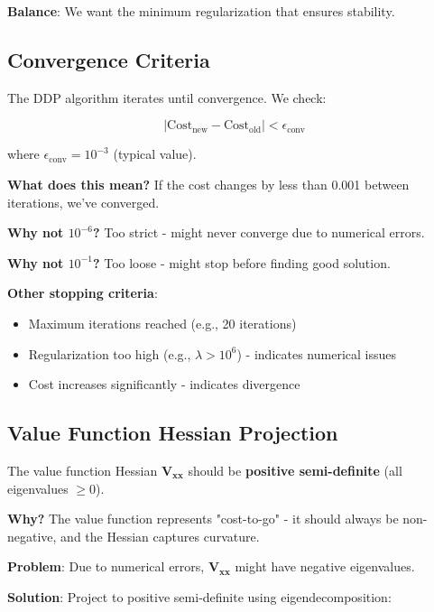 \documentclass[11pt,a4paper]{article}
\begin{document}
\textbf{Balance}: We want the minimum regularization that ensures stability.

\subsection{Convergence Criteria}

The DDP algorithm iterates until convergence. We check:

\begin{equation}
|\text{Cost}_{\text{new}} - \text{Cost}_{\text{old}}| < \epsilon_{\text{conv}}
\end{equation}

where $\epsilon_{\text{conv}} = 10^{-3}$ (typical value).

\textbf{What does this mean?} If the cost changes by less than 0.001 between iterations, we've converged.

\textbf{Why not $10^{-6}$?} Too strict - might never converge due to numerical errors.

\textbf{Why not $10^{-1}$?} Too loose - might stop before finding good solution.

\textbf{Other stopping criteria}:
\begin{itemize}
    \item Maximum iterations reached (e.g., 20 iterations)
    \item Regularization too high (e.g., $\lambda > 10^6$) - indicates numerical issues
    \item Cost increases significantly - indicates divergence
\end{itemize}

\subsection{Value Function Hessian Projection}

The value function Hessian $\mathbf{V}_{\mathbf{xx}}$ should be \textbf{positive semi-definite} (all eigenvalues $\geq 0$).

\textbf{Why?} The value function represents "cost-to-go" - it should always be non-negative, and the Hessian captures curvature.

\textbf{Problem}: Due to numerical errors, $\mathbf{V}_{\mathbf{xx}}$ might have negative eigenvalues.

\textbf{Solution}: Project to positive semi-definite using eigendecomposition:
\end{document}
